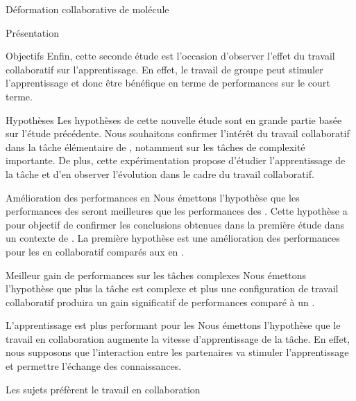 \documentclass[myfrancais]{mythesis}
\begin{document}
\begin{mychapter}{Déformation collaborative de molécule}
\begin{mysection}{Présentation}
\begin{mysubsection}{Objectifs}
				Enfin, cette seconde étude est l'occasion d'observer l'effet du travail collaboratif sur l'apprentissage.
				En effet, le travail de groupe peut stimuler l'apprentissage et donc être bénéfique en terme de performances sur le court terme.
			\end{mysubsection}
			\begin{mysubsection}{Hypothèses}
				Les hypothèses de cette nouvelle étude sont en grande partie basée sur l'étude précédente.
				Nous souhaitons confirmer l'intérêt du travail collaboratif dans la tâche élémentaire de , notamment sur les tâches de complexité importante.
				De plus, cette expérimentation propose d'étudier l'apprentissage de la tâche et d'en observer l'évolution dans le cadre du travail collaboratif.
				\begin{myparagraph}{ Amélioration des performances en }
					Nous émettons l'hypothèse que les performances des  seront meilleures que les performances des .
					Cette hypothèse a pour objectif de confirmer les conclusions obtenues dans la première étude dans un contexte de .
					La première hypothèse est une amélioration des performances pour les  en collaboratif comparés aux  en .
				\end{myparagraph}
				\begin{myparagraph}{ Meilleur gain de performances sur les tâches complexes}
					Nous émettons l'hypothèse que plus la tâche est complexe et plus une configuration de travail collaboratif produira un gain significatif de performances comparé à un .
				\end{myparagraph}
				\begin{myparagraph}{ L'apprentissage est plus performant pour les }
					Nous émettons l'hypothèse que le travail en collaboration augmente la vitesse d'apprentissage de la tâche.
					En effet, nous supposons que l'interaction entre les partenaires va stimuler l'apprentissage et permettre l'échange des connaissances.
				\end{myparagraph}
				\begin{myparagraph}{ Les sujets préfèrent le travail en collaboration}

\end{myparagraph}
\end{mysubsection}
\end{mysection}
\end{mychapter}
\end{document}
